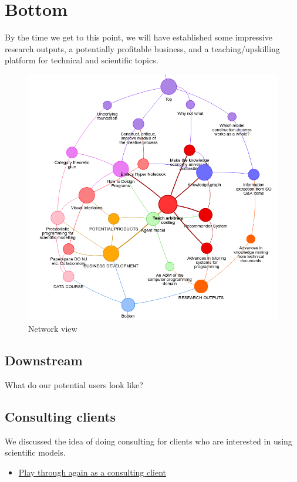 \documentclass[11pt]{article}
\begin{document}
\section{Bottom}
\label{sec:orgfd5d2e7}
By the time we get to this point, we will have established some
impressive research outputs, a potentially profitable business, and a
teaching/upskilling platform for technical and scientific topics.

\begin{figure}[htbp]
\centering
\includegraphics[width=\textwidth]{org-roam-server-3oct2020.png}
\caption{Network view}
\end{figure}

\subsection{Downstream}
\label{sec:org39f628d}
What do our potential users look like?
\subsection{Consulting clients}
\label{sec:orgdaeeda1}
We discussed the idea of doing consulting for clients who are
interested in using scientific models.

\begin{itemize}
\item \href{0caba40b-2561-4143-b2b1-55f3ddc3201b}{Play through again as a consulting client}
\end{itemize}
\end{document}
